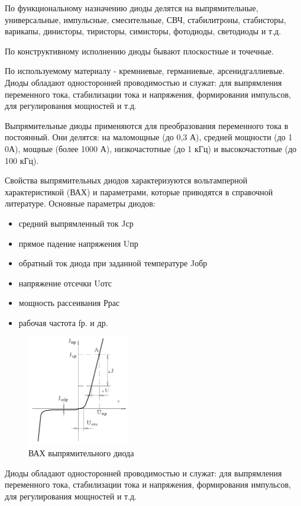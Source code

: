 \documentclass[unicode, 12pt, a4paper, oneside]{article}
\begin{document}
По функциональному назначению диоды делятся на выпрямительные, универсальные, импульсные, смесительные, СВЧ, стабилитроны, стабисторы, варикапы, динисторы, тиристоры, симисторы, фотодиоды, светодиоды и т.д.

По конструктивному исполнению диоды бывают плоскостные и точечные.

По используемому материалу - кремниевые, германиевые, арсенидгаллиевые. Диоды обладают односторонней проводимостью и служат: для выпрямления переменного тока, стабилизации тока и напряжения, формирования импульсов, для регулирования мощностей и т.д.

Выпрямительные диоды применяются для преобразования переменного тока в постоянный. Они делятся: на маломощные (до 0,3 А), средней мощности (до 1 0А), мощные (более 1000 А), низкочастотные (до 1 кГц) и высокочастотные (до 100 кГц).

Свойства выпрямительных диодов характеризуются вольтамперной характеристикой (ВАХ) и параметрами, которые приводятся в справочной литературе.
Основные параметры диодов:
\begin{itemize}
\item средний выпрямленный ток Jср
\item прямое падение напряжения Uпр
\item обратный ток диода при заданной температуре Jобр
\item напряжение отсечки Uотс
\item мощность рассеивания Ррас
\item рабочая частота fр. и др.
\end{itemize}

\begin{figure}[htbp]
\centering
\includegraphics[width=0.4\textwidth]{2_VAC_of_diod.png}
\caption{ВАХ выпрямительного диода}
\label{fig:2_VAC_of_diod}
\end{figure}

Диоды обладают односторонней проводимостью и служат: для выпрямления переменного тока, стабилизации тока и напряжения, формирования импульсов, для регулирования мощностей и т.д.
\end{document}
